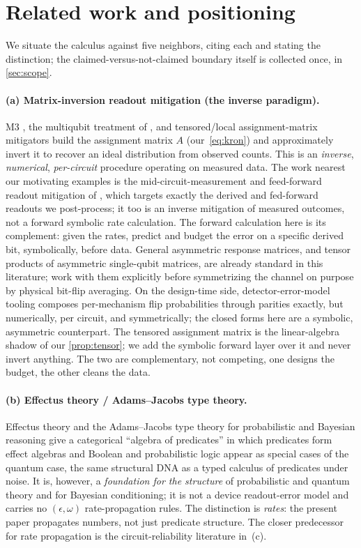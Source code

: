 \documentclass[11pt]{article}
\numberwithin{equation}{section}
\theoremstyle{plain}
\theoremstyle{definition}
\theoremstyle{remark}
\newcommand{\eps}{\epsilon}
\begin{document}
\section{Related work and positioning}
\label{sec:related}

We situate the calculus against five neighbors, citing each and stating the
distinction; the claimed-versus-not-claimed boundary itself is collected once,
in \cref{sec:scope}.

\paragraph{(a) Matrix-inversion readout mitigation (the inverse paradigm).}
M3 \citep{nation2021m3}, the multiqubit treatment of
\citet{bravyi2021mitigating}, and tensored/local assignment-matrix mitigators
build the assignment matrix $A$ (our~\eqref{eq:kron}) and approximately invert it
to recover an ideal distribution from observed counts. This is an \emph{inverse},
\emph{numerical}, \emph{per-circuit} procedure operating on measured data. The
work nearest our motivating examples is the mid-circuit-measurement and
feed-forward readout mitigation of \citet{koh2024readout}, which targets exactly
the derived and fed-forward readouts we post-process; it too is an inverse
mitigation of measured outcomes, not a forward symbolic rate calculation. The
forward calculation here is its complement: given the rates, predict and budget
the error on a specific derived bit, symbolically, before data. General
asymmetric response matrices, and tensor products of asymmetric single-qubit
matrices, are already standard in this literature; \citet{smith2021bitflip}
work with them explicitly before symmetrizing the channel on purpose by
physical bit-flip averaging. On the design-time side,
detector-error-model tooling \citep{gidney2021stim} composes per-mechanism flip
probabilities through parities exactly, but numerically, per circuit, and
symmetrically; the closed forms here are a symbolic, asymmetric counterpart.
The tensored assignment
matrix is the linear-algebra shadow of our \cref{prop:tensor}; we add the
symbolic forward layer over it and never invert anything. The two are
complementary, not competing, one designs the budget, the other cleans the
data.

\paragraph{(b) Effectus theory / Adams--Jacobs type theory.}
Effectus theory and the Adams--Jacobs type theory for probabilistic and Bayesian
reasoning \citep{cho2015effectus,adams2015typetheory} give a categorical
``algebra of predicates'' in which predicates form effect algebras and Boolean
and probabilistic logic appear as special cases of the quantum case, the same
structural DNA as a typed calculus of predicates under noise. It is, however, a
\emph{foundation for the structure} of probabilistic and quantum theory and for
Bayesian conditioning; it is not a device readout-error model and carries no
$(\eps,\omega)$ rate-propagation rules. The distinction is \emph{rates}: the
present paper propagates numbers, not just predicate structure. The closer
predecessor for rate propagation is the circuit-reliability literature
in~(c).
\end{document}
